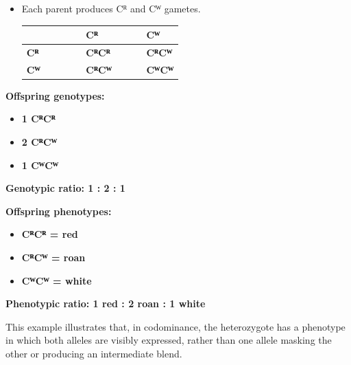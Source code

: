\documentclass[
  letterpaper,
  DIV=11,
  numbers=noendperiod]{scrreprt}
\newcounter{none} %
\begin{document}
\begin{itemize}
\item
  Each parent produces Cᴿ and Cᵂ gametes.

  {\def\LTcaptype{none} %
  \begin{longtable}[]{@{}
    >{\raggedright\arraybackslash}p{}
    >{\raggedright\arraybackslash}p{}
    >{\raggedright\arraybackslash}p{}@{}}
  \toprule\noalign{}
  \begin{minipage}[b]{\linewidth}\raggedright
  \textbf{~~~~~~~~~}
  \end{minipage} & \begin{minipage}[b]{\linewidth}\raggedright
  \textbf{Cᴿ~~~~~~~}
  \end{minipage} & \begin{minipage}[b]{\linewidth}\raggedright
  \textbf{Cᵂ}
  \end{minipage} \\
  \midrule\noalign{}
  \endhead
  \bottomrule\noalign{}
  \endlastfoot
  \textbf{Cᴿ~~} & \textbf{CᴿCᴿ~~~} & \textbf{CᴿCᵂ} \\
  \textbf{Cᵂ~~} & \textbf{CᴿCᵂ~~~} & \textbf{CᵂCᵂ} \\
  \end{longtable}
  }
\end{itemize}

\textbf{Offspring genotypes:}

\begin{itemize}
\item
  \textbf{1 CᴿCᴿ}
\item
  \textbf{2 CᴿCᵂ}
\item
  \textbf{1 CᵂCᵂ}
\end{itemize}

\textbf{Genotypic ratio: 1 : 2 : 1}

\textbf{Offspring phenotypes:}

\begin{itemize}
\item
  \textbf{CᴿCᴿ = red}
\item
  \textbf{CᴿCᵂ = roan}
\item
  \textbf{CᵂCᵂ = white}
\end{itemize}

\textbf{Phenotypic ratio: 1 red : 2 roan : 1 white}

This example illustrates that, in codominance, the heterozygote has a
phenotype in which both alleles are visibly expressed, rather than one
allele masking the other or producing an intermediate blend.
\end{document}
